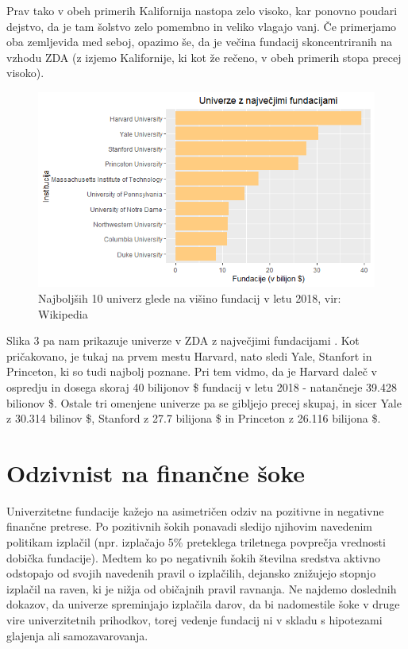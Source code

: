 \documentclass[12pt, a4paper]{article}
\begin{document}
Prav tako v obeh primerih Kalifornija nastopa zelo visoko, kar ponovno poudari dejstvo, da je tam šolstvo zelo pomembno in veliko vlagajo vanj. Če primerjamo oba zemljevida med seboj, opazimo še, da je večina fundacij skoncentriranih na vzhodu ZDA (z izjemo Kalifornije, ki kot že rečeno, v obeh primerih stopa precej visoko).

\begin{figure}[!h]
\centering
\includegraphics[width = 15 cm]{grafi_zemljevidi/top10.png}
\caption{Najboljših 10 univerz glede na višino fundacij v letu 2018, vir: Wikipedia}
\label{Slika 3}
\end{figure}

Slika 3 pa nam prikazuje univerze v ZDA z največjimi fundacijami \cite{wiki}. Kot pričakovano, je tukaj na prvem mestu Harvard, nato sledi Yale, Stanfort in Princeton, ki so tudi najbolj poznane. Pri tem vidmo, da je Harvard daleč v ospredju in dosega skoraj 40 bilijonov \$ fundacij v letu 2018 - natančneje 39.428 bilionov \$. Ostale tri omenjene univerze pa se gibljejo precej skupaj, in sicer Yale z 30.314
bilinov \$, Stanford z 27.7 bilijona \$ in Princeton z 26.116 bilijona \$.

\newpage
\section[Odzivnost na finančne šoke]{Odzivnist na finančne šoke}

Univerzitetne fundacije kažejo na asimetričen odziv na pozitivne in negativne finančne pretrese. Po pozitivnih šokih ponavadi sledijo njihovim navedenim politikam izplačil (npr. izplačajo 5\% preteklega triletnega povprečja vrednosti dobička fundacije). Medtem ko po negativnih šokih številna sredstva aktivno odstopajo od svojih navedenih pravil o izplačilih, dejansko znižujejo stopnjo izplačil na raven, ki je nižja od običajnih pravil ravnanja. Ne najdemo doslednih dokazov, da univerze spreminjajo izplačila darov, da bi nadomestile šoke v druge vire univerzitetnih prihodkov, torej vedenje fundacij ni v skladu s hipotezami glajenja ali samozavarovanja.
\end{document}
